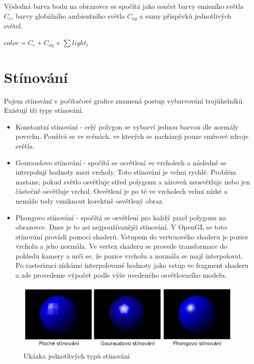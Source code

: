 \documentclass[11pt,twoside,a4paper]{book}
\begin{document}
Výsledná barva bodu na obrazovce se spočítá jako součet barvy emisního světla $C_e$, barvy globálního ambientního světla $C_{ag}$ a sumy příspěvků jednotlivých světel.
\begin{center}
$color = C_e + C_{ag} + \sum_{}{} light_i$
\end{center}

\section{Stínování}
Pojem stínování v počítačové grafice znamená postup vybarvování trojúhelníků. Existují tři typy stínování.
\begin{itemize}
\item Konstantní stínování - celý polygon se vybarví jednou barvou dle normály povrchu. Používá se ve scénách, ve kterých se nacházejí pouze směrové zdroje světla.
\item Gouraudovo stínování - spočítá se osvětlení ve vrcholech a následně se interpolují hodnoty mezi vrcholy. Toto stínování je velmi rychlé. Problém nastane, pokud světlo osvětluje střed polygonu a zároveň neosvětluje nebo jen částečně osvětluje vrchol. Osvětlení je po té ve vrcholech velmi nízké a nemůže tedy vzniknout korektně osvětlený obraz.
\item Phongovo stínování - spočítá se osvětlení pro každý pixel polygonu na obrazovce. Dnes je to asi nejpoužívanější stínování. V OpenGL se toto stínování provádí pomocí shaderů. Vstupem do vertexového shaderu je pozice vrcholu a jeho normála. Ve vertex shaderu se provede transformace do pohledu kamery a určí se, že pozice vrcholu a normála se mají interpolovat. Po rasterizaci získáme interpolované hodnoty jako vstup ve fragment shaderu a zde provedeme výpočet podle výše uvedeného osvětlovacího modelu.
\end{itemize}

\begin{center}
\begin{figure}[h]
\includegraphics[width=135mm]{figures/shading.png}
\caption{Ukázka jednotlivých typů stínování}
\end{figure}
\end{center}
\newpage
\end{document}
